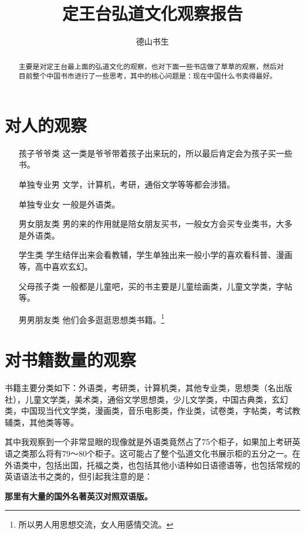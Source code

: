 \documentclass[11pt,oneside]{article}
\begin{document}
\title{定王台弘道文化观察报告}
\author{德山书生}
\date{}
\maketitle

\begin{abstract}
主要是对定王台最上面的弘道文化的观察，也对下面一些书店做了草草的观察，然后对目前整个中国书市进行了一些思考，其中的核心问题是：现在中国什么书卖得最好。
\end{abstract}


\begin{common-format}

\section{对人的观察}
\begin{itemize}
\item[孩子爷爷类] 这一类是爷爷带着孩子出来玩的，所以最后肯定会为孩子买一些书。
\item[单独专业男] 文学，计算机，考研，通俗文学等等都会涉猎。
\item[单独专业女] 一般是外语类。
\item[男女朋友类] 男的来的作用就是陪女朋友买书，一般女方会买专业类书，大多是外语类。
\item[学生类] 学生结伴出来会看教辅，学生单独出来一般小学的喜欢看科普、漫画等，高中喜欢玄幻。
\item[父母孩子类] 一般都是儿童吧，买的书主要是儿童绘画类，儿童文学类，字帖等。
\item[男男朋友类] 他们会多逛逛思想类书籍。\footnote{所以男人用思想交流，女人用感情交流。} 
\end{itemize}

\section{对书籍数量的观察}
书籍主要分类如下：外语类，考研类，计算机类，其他专业类，思想类（名出版社），儿童文学类，美术类，通俗文学思想类，少儿文学类，中国古典类，玄幻类，中国现当代文学类，漫画类，音乐电影类，作业类，试卷类，字帖类，考试教辅类，其他类等等。

其中我观察到一个非常显眼的现像就是外语类竟然占了75个柜子，如果加上考研英语之类那么将有79～80个柜子。这可能占了整个弘道文化书展示柜的五分之一。在外语类中，包括出国，托福之类，也包括其他小语种如日语德语等，也包括常规的英语语法书之类的，但引起我注意的是：

\textbf{那里有大量的国外名著英汉对照双语版。}


\end{common-format}
\end{document}
